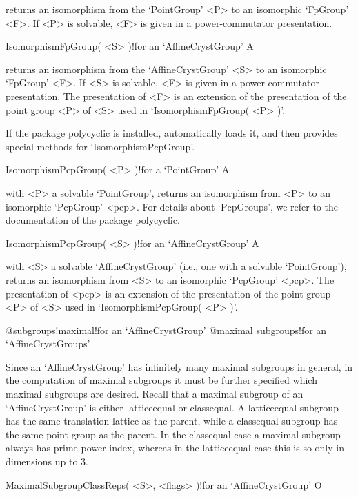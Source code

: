 returns an isomorphism from the `PointGroup' <P> to an isomorphic
`FpGroup' <F>. If <P> is solvable, <F> is given in a 
power-commutator presentation. 

\>IsomorphismFpGroup( <S> )!{for an `AffineCrystGroup'} A

returns an isomorphism from the `AffineCrystGroup' <S> to an isomorphic
`FpGroup' <F>. If <S> is solvable, <F> is given in a power-commutator 
presentation. The presentation of <F> is an extension of the presentation
of the point group <P> of <S> used in `IsomorphismFpGroup( <P> )'. 

If the package polycyclic is installed, {\Cryst} automatically loads
it, and then provides special methods for `IsomorphismPcpGroup'.

\>IsomorphismPcpGroup( <P> )!{for a `PointGroup'} A

with <P> a solvable `PointGroup', returns an isomorphism from <P> 
to an isomorphic `PcpGroup' <pcp>. For details about `PcpGroups', 
we refer to the documentation of the package polycyclic.  

\>IsomorphismPcpGroup( <S> )!{for an `AffineCrystGroup'} A

with <S> a solvable `AffineCrystGroup' (i.e., one with a solvable
`PointGroup'), returns an isomorphism from <S> to an isomorphic
`PcpGroup' <pcp>. The presentation of <pcp> is an extension of the 
presentation of the point group <P> of <S> used in 
`IsomorphismPcpGroup( <P> )'. 


%
{@subgroups!maximal!for an \noexpand`AffineCrystGroup'}
%
{@maximal subgroups!for an \noexpand`AffineCrystGroups'}

Since an `AffineCrystGroup' has infinitely many maximal subgroups in general,
in the computation of maximal subgroups it must be further specified which
maximal subgroups are desired. Recall that a maximal subgroup of an
`AffineCrystGroup' is either latticeequal or classequal. A latticeequal 
subgroup has the same translation lattice as the parent, while a 
classequal subgroup has the same point group as the parent. In the 
classequal case a maximal subgroup always has prime-power index, whereas
in the latticeequal case this is so only in dimensions up to 3.

\>MaximalSubgroupClassReps( <S>, <flags> )!{for an `AffineCrystGroup'} O

